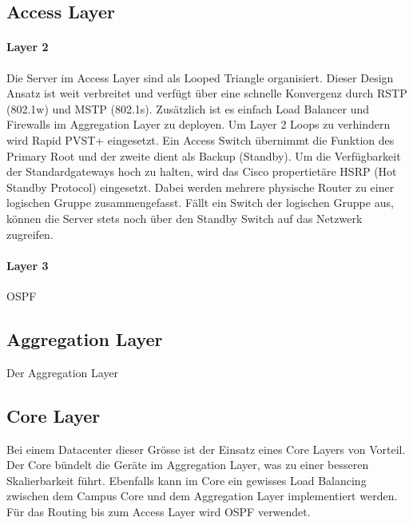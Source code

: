 
\subsection{Access Layer}
\paragraph{Layer 2}
Die Server im Access Layer sind als Looped Triangle organisiert. Dieser Design Ansatz ist weit verbreitet und verfügt über eine schnelle Konvergenz durch RSTP (802.1w) und MSTP (802.1s). Zusätzlich ist es einfach Load Balancer und Firewalls im Aggregation Layer zu deployen. Um Layer 2 Loops zu verhindern wird Rapid PVST+ eingesetzt. Ein Access Switch übernimmt die Funktion des Primary Root und der zweite dient als Backup (Standby). Um die Verfügbarkeit der Standardgateways hoch zu halten, wird das Cisco propertietäre HSRP (Hot Standby Protocol) eingesetzt.  Dabei werden mehrere physische Router zu einer logischen Gruppe zusammengefasst. Fällt ein Switch der logischen Gruppe aus, können die Server stets noch über den Standby Switch auf das Netzwerk zugreifen. 

\paragraph{Layer 3}
OSPF

\subsection{Aggregation Layer}
Der Aggregation Layer 



\subsection{Core Layer}
Bei einem Datacenter dieser Grösse ist der Einsatz eines Core Layers von Vorteil. Der Core bündelt die Geräte im Aggregation Layer, was zu einer besseren Skalierbarkeit führt. Ebenfalls kann im Core ein gewisses Load Balancing zwischen dem Campus Core und dem Aggregation Layer implementiert werden. Für das Routing bis zum Access Layer wird OSPF verwendet.  


